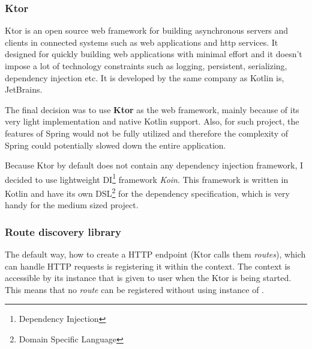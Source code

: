 \subsubsection{Ktor}
Ktor is an open source web framework for building asynchronous servers 
and clients in connected systems such as web applications and http services.
It designed for quickly building web applications with minimal effort 
and it doesn't impose a lot of technology constraints such as logging, persistent, serializing, dependency injection etc.
It is developed by the same company as Kotlin is, JetBrains.


\bigskip
The final decision was to use \textbf{Ktor} as the web framework,
mainly because of its very light implementation and native Kotlin support.
Also, for such project, 
the features of Spring would not be fully utilized
and therefore the complexity of Spring could potentially slowed down the entire application.

Because Ktor by default does not contain any dependency injection framework, 
I decided to use lightweight DI\footnote{Dependency Injection} framework \textit{Koin}.
This framework is written in Kotlin and have its own DSL\footnote{Domain Specific Language} for the dependency specification,
which is very handy for the medium sized project.

\subsubsection{Route discovery library}
The default way, how to create a HTTP endpoint (Ktor calls them \textit{routes}),
which can handle HTTP requests is registering it within the  context.
The  context is accessible by its instance that is given to user when the Ktor is being started.
This means that no \textit{route} can be registered without using instance of .

